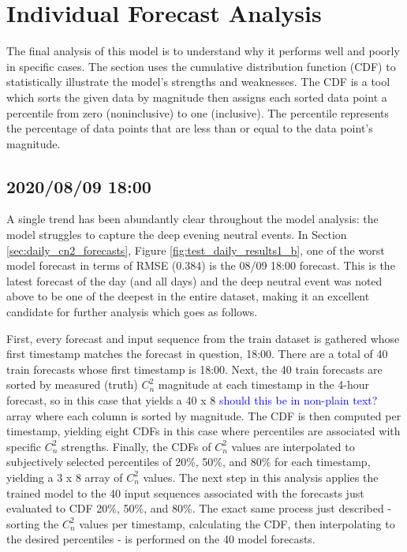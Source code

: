 \section{Individual Forecast Analysis}
The final analysis of this model is to understand why it performs well and poorly in specific cases. The section uses the cumulative distribution function (CDF) to statistically illustrate the model's strengths and weaknesses. The CDF is a tool which sorts the given data by magnitude then assigns each sorted data point a percentile from zero (noninclusive) to one (inclusive). The percentile represents the percentage of data points that are less than or equal to the data point's magnitude.

\subsection{2020/08/09 18:00}
A single trend has been abundantly clear throughout the model analysis: the model struggles to capture the deep evening neutral events. In Section \ref{sec:daily_cn2_forecasts}, Figure \ref{fig:test_daily_results1_b}, one of the worst model forecast in terms of RMSE (0.384) is the 08/09 18:00 forecast. This is the latest forecast of the day (and all days) and the deep neutral event was noted above to be one of the deepest in the entire dataset, making it an excellent candidate for further analysis which goes as follows.

First, every forecast and input sequence from the train dataset is gathered whose first timestamp matches the forecast in question, 18:00. There are a total of 40 train forecasts whose first timestamp is 18:00. Next, the 40 train forecasts are sorted by measured (truth) $C_{n}^{2}$ magnitude at each timestamp in the 4-hour forecast, so in this case that yields a 40 x 8 \textcolor{blue}{should this be in non-plain text?} array where each column is sorted by magnitude. The CDF is then computed per timestamp, yielding eight CDFs in this case where percentiles are associated with specific $C_{n}^{2}$ strengths. Finally, the CDFs of $C_{n}^{2}$ values are interpolated to subjectively selected percentiles of  20\%, 50\%, and 80\% for each timestamp, yielding a 3 x 8 array of $C_{n}^{2}$ values. The next step in this analysis applies the trained model to the 40 input sequences associated with the forecasts just evaluated to CDF 20\%, 50\%, and 80\%. The exact same process just described - sorting the $C_{n}^{2}$ values per timestamp, calculating the CDF, then interpolating to the desired percentiles - is performed on the 40 model forecasts.

